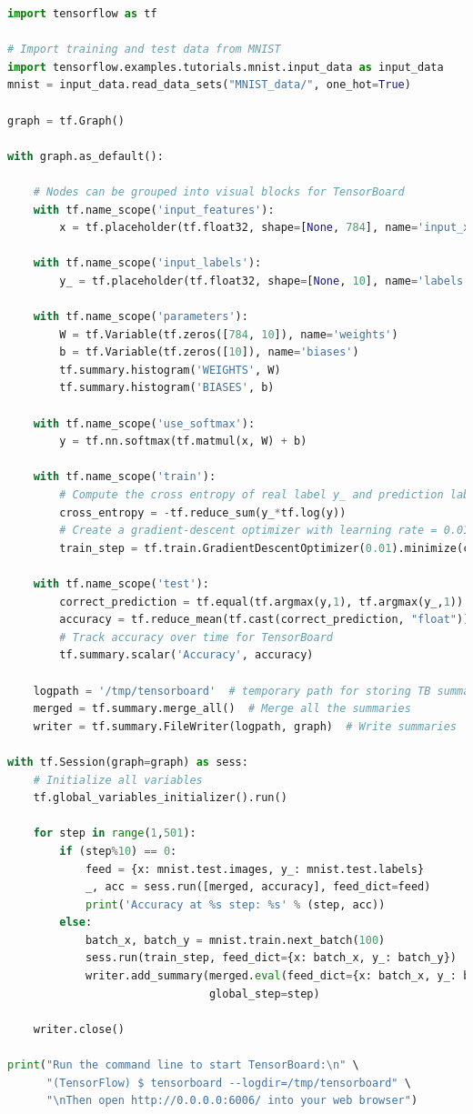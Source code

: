 \documentclass[11pt, oneside]{article}   	%
\begin{document}
\begin{lstlisting}[language=python]
import tensorflow as tf

# Import training and test data from MNIST
import tensorflow.examples.tutorials.mnist.input_data as input_data
mnist = input_data.read_data_sets("MNIST_data/", one_hot=True)

graph = tf.Graph()

with graph.as_default():

    # Nodes can be grouped into visual blocks for TensorBoard
    with tf.name_scope('input_features'):
        x = tf.placeholder(tf.float32, shape=[None, 784], name='input_x')

    with tf.name_scope('input_labels'):
        y_ = tf.placeholder(tf.float32, shape=[None, 10], name='labels')

    with tf.name_scope('parameters'):
        W = tf.Variable(tf.zeros([784, 10]), name='weights')
        b = tf.Variable(tf.zeros([10]), name='biases')
        tf.summary.histogram('WEIGHTS', W)
        tf.summary.histogram('BIASES', b)
    
    with tf.name_scope('use_softmax'):
        y = tf.nn.softmax(tf.matmul(x, W) + b)

    with tf.name_scope('train'):
        # Compute the cross entropy of real label y_ and prediction label y
        cross_entropy = -tf.reduce_sum(y_*tf.log(y))
        # Create a gradient-descent optimizer with learning rate = 0.01
        train_step = tf.train.GradientDescentOptimizer(0.01).minimize(cross_entropy)

    with tf.name_scope('test'):
        correct_prediction = tf.equal(tf.argmax(y,1), tf.argmax(y_,1))
        accuracy = tf.reduce_mean(tf.cast(correct_prediction, "float"))
        # Track accuracy over time for TensorBoard
        tf.summary.scalar('Accuracy', accuracy)

    logpath = '/tmp/tensorboard'  # temporary path for storing TB summaries
    merged = tf.summary.merge_all()  # Merge all the summaries
    writer = tf.summary.FileWriter(logpath, graph)  # Write summaries

with tf.Session(graph=graph) as sess:
    # Initialize all variables
    tf.global_variables_initializer().run()
    
    for step in range(1,501):
        if (step%10) == 0:
            feed = {x: mnist.test.images, y_: mnist.test.labels}
            _, acc = sess.run([merged, accuracy], feed_dict=feed)
            print('Accuracy at %s step: %s' % (step, acc))
        else:
            batch_x, batch_y = mnist.train.next_batch(100)
            sess.run(train_step, feed_dict={x: batch_x, y_: batch_y})
            writer.add_summary(merged.eval(feed_dict={x: batch_x, y_: batch_y}), 
                               global_step=step)

    writer.close()

print("Run the command line to start TensorBoard:\n" \
      "(TensorFlow) $ tensorboard --logdir=/tmp/tensorboard" \
      "\nThen open http://0.0.0.0:6006/ into your web browser")
\end{lstlisting}
\end{document}
